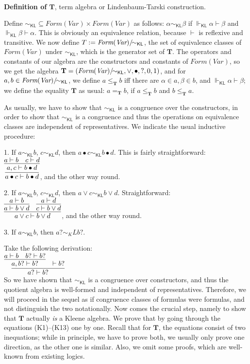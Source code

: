 \documentclass{eptcs}
\newcommand{\KL}{\mathsf{KL}}
\begin{document}
\textbf{Definition of $\textbf{T}$}, term algebra 
or Lindenbaum-Tarski construction.

Define $\sim_{\KL}\subseteq \textit{Form}(\textit{Var})\times \textit{Form}(\textit{Var})$ as follows:
$\alpha\sim_{\KL}\beta$ if $\Vdash_{\KL}\alpha\vdash\beta$ and
$\Vdash_{\KL}\beta\vdash\alpha$. This is obviously an equivalence 
relation, because $\vdash$ is reflexive and transitive. 
We now define $T:=\textit{Form}(\textit{Var})/\negmedspace\negmedspace\sim_{\KL}$, 
the set of equivalence classes of $\textit{Form}(\textit{Var})$ under 
$\sim_{\KL}$, which is the generator set of $\textbf{T}$. 
The operators and constants of our algebra are 
the constructors and constants of
$\textit{Form}(\textit{Var})$, so we get the algebra 
$\textbf{T}=(\textit{Form}(\textit{Var})/\negmedspace\negmedspace\sim_{\KL},\vee,\bullet,?,0,1)$, and for 
$a,b\in \textit{Form}(\textit{Var})/\negmedspace\negmedspace\sim_{\KL}$,
we define $a\leq_\textbf{T} b$ iff there are $\alpha\in a,
\beta\in b$, and $\Vdash_{\KL} \alpha\vdash \beta$; we define
the equality 
$\textbf{T}$ as usual: $a=_\textbf{T}b$, if $a\leq_\textbf{T} b$ 
and $b\leq_\textbf{T} a$. 

As usually, we have to show that $\sim_{\KL}$ is a congruence over
the constructors, in order to show that $\sim_\KL$ is a congruence
and thus the operations on equivalence classes are independent
of representatives. We indicate the usual inductive procedure:

1. If $a\sim_\KL b$, $c\sim_\KL d$, then $a\bullet c\sim_\KL b\bullet d$.
This is fairly straightforward:
\\

$\infer{a\bullet c\vdash b\bullet d}
{\infer{a,c\vdash b\bullet d}{a\vdash b& c\vdash d}}$, 
and the other way round.

2. If $a\sim_\KL b$, $c\sim_\KL d$, then $a\vee c\sim_\KL b\vee d$.
Straightforward:
\\

$\infer{a\vee c\vdash b\vee d}
{\infer{a\vdash b\vee d}{a\vdash b}&\infer{c\vdash b\vee d}{a\vdash d}}$,
and the other way round.

3. If $a\sim_\KL b$, then $a?\sim_KL b?$.

Take the following derivation:
\\

$\infer{a?\vdash b?}
{\infer{a,b?\vdash b?}{a\vdash b & b? \vdash b?}& \vdash b?}$
\\

So we have shown that $\sim_\KL$ is a congruence over constructors,
and thus the quotient algebra is well-formed and independent of
representatives. Therefore, we will proceed in the sequel as
if congruence classes of formulas were formulas, and not distinguish
the two notationally.
Now comes the crucial step, namely to show that $\textbf{T}$ actually
\textit{is} a Kleene algebra. We prove that by going through
the equations (K1)--(K13) one by one. Recall that for $\textbf{T}$,
the equations consist of two inequations; while in principle, we have
to prove both, we usually 
only prove one direction, as the other one is similar.
Also, we omit some proofs, which are well-known from
existing logics.
\\
\end{document}
